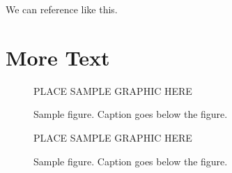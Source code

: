 \documentclass[master]{thesis}
\begin{document}
We can reference  like this.

\chapter{More Text}
\label{chap:more}

\lipsum[1-10]

\begin{figure}[hp] %
    PLACE SAMPLE GRAPHIC HERE
    \caption{Sample figure.  Caption goes below the figure.}
    \label{fig:sample}
\end{figure}
\begin{figure}[hp] %
    PLACE SAMPLE GRAPHIC HERE
    \caption{Sample figure.  Caption goes below the figure.}
    \label{fig:sample}
\end{figure}
\end{document}
